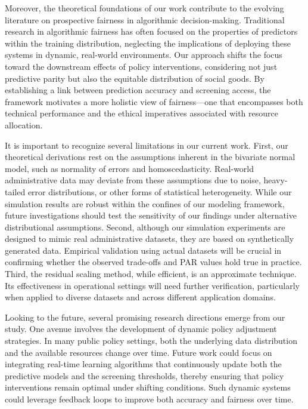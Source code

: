 \documentclass{article}
\begin{document}
Moreover, the theoretical foundations of our work contribute to the evolving literature on prospective fairness in algorithmic decision-making. Traditional research in algorithmic fairness has often focused on the properties of predictors within the training distribution, neglecting the implications of deploying these systems in dynamic, real-world environments. Our approach shifts the focus toward the downstream effects of policy interventions, considering not just predictive parity but also the equitable distribution of social goods. By establishing a link between prediction accuracy and screening access, the framework motivates a more holistic view of fairness—one that encompasses both technical performance and the ethical imperatives associated with resource allocation.

It is important to recognize several limitations in our current work. First, our theoretical derivations rest on the assumptions inherent in the bivariate normal model, such as normality of errors and homoscedasticity. Real-world administrative data may deviate from these assumptions due to noise, heavy-tailed error distributions, or other forms of statistical heterogeneity. While our simulation results are robust within the confines of our modeling framework, future investigations should test the sensitivity of our findings under alternative distributional assumptions. Second, although our simulation experiments are designed to mimic real administrative datasets, they are based on synthetically generated data. Empirical validation using actual datasets will be crucial in confirming whether the observed trade-offs and PAR values hold true in practice. Third, the residual scaling method, while efficient, is an approximate technique. Its effectiveness in operational settings will need further verification, particularly when applied to diverse datasets and across different application domains.

Looking to the future, several promising research directions emerge from our study. One avenue involves the development of dynamic policy adjustment strategies. In many public policy settings, both the underlying data distribution and the available resources change over time. Future work could focus on integrating real-time learning algorithms that continuously update both the predictive models and the screening thresholds, thereby ensuring that policy interventions remain optimal under shifting conditions. Such dynamic systems could leverage feedback loops to improve both accuracy and fairness over time.
\end{document}

